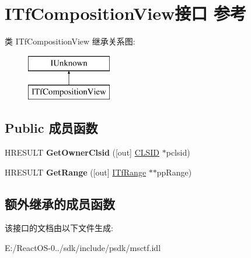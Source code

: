 \hypertarget{interface_i_tf_composition_view}{}\section{I\+Tf\+Composition\+View接口 参考}
\label{interface_i_tf_composition_view}
类 I\+Tf\+Composition\+View 继承关系图\+:\begin{figure}[H]
\begin{center}
\leavevmode
\includegraphics[height=2.000000cm]{interface_i_tf_composition_view}
\end{center}
\end{figure}
\subsection*{Public 成员函数}
\begin{DoxyCompactItemize}
\item 
\mbox{\label{interface_i_tf_composition_view_afb40804870643ef6fcedcd636bfabaf8}} 
H\+R\+E\+S\+U\+LT {\bfseries Get\+Owner\+Clsid} (\mbox{[}out\mbox{]} \hyperlink{struct___i_i_d}{C\+L\+S\+ID} $\ast$pclsid)
\item 
\mbox{\label{interface_i_tf_composition_view_a7a40df384ee52d40c169e81c931b4a33}} 
H\+R\+E\+S\+U\+LT {\bfseries Get\+Range} (\mbox{[}out\mbox{]} \hyperlink{interface_i_tf_range}{I\+Tf\+Range} $\ast$$\ast$pp\+Range)
\end{DoxyCompactItemize}
\subsection*{额外继承的成员函数}


该接口的文档由以下文件生成\+:\begin{DoxyCompactItemize}
\item 
E\+:/\+React\+O\+S-\/0../sdk/include/psdk/msctf.\+idl\end{DoxyCompactItemize}
